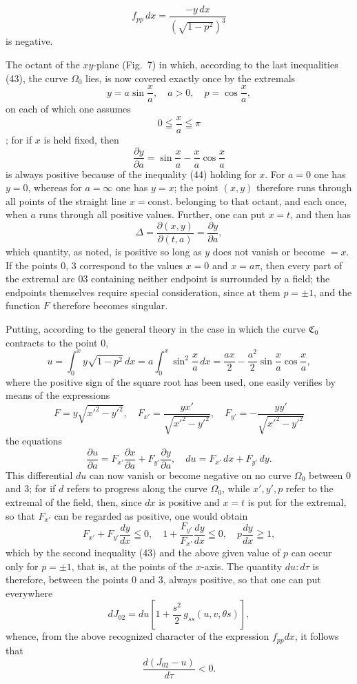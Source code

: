 \documentclass[11pt,a4paper,leqno]{article}
\begin{document}
\[
f_{pp}\,dx=\frac{-y\,dx}{\left(\sqrt{1-p^2}\right)^3}
\]
is negative.

The octant of the $xy$-plane (Fig.~7) in which, according to the last inequalities (43), the curve $\Omega_0$ lies, is now covered exactly once by the extremals
\[
y=a\sin\frac{x}{a},\quad a>0,\quad p=\cos\frac{x}{a},
\]
on each of which one assumes
\begin{equation}\tag{44}
0\leqq\frac{x}{a}\leqq\pi
\end{equation}
; for if $x$ is held fixed, then
\[
\frac{\partial y}{\partial a}
=\sin\frac{x}{a}-\frac{x}{a}\cos\frac{x}{a}
\]
is always positive because of the inequality (44) holding for $x$. For $a=0$ one has $y=0$, whereas for $a=\infty$ one has $y=x$; the point $(x,y)$ therefore runs through all points of the straight line $x=\text{const.}$ belonging to that octant, and each once, when $a$ runs through all positive values. Further, one can put $x=t$, and then has
\[
\Delta=\frac{\partial(x,y)}{\partial(t,a)}
=\frac{\partial y}{\partial a},
\]
which quantity, as noted, is positive so long as $y$ does not vanish or become $=x$. If the points 0, 3 correspond to the values $x=0$ and $x=a\pi$, then every part of the extremal arc 03 containing neither endpoint is surrounded by a field; the endpoints themselves require special consideration, since at them $p=\pm1$, and the function $F$ therefore becomes singular.

Putting, according to the general theory in the case in which the curve $\mathfrak{C}_0$ contracts to the point 0,
\[
u=\int_0^x y\sqrt{1-p^2}\,dx
=a\int_0^x\sin^2\frac{x}{a}\,dx
=\frac{ax}{2}-\frac{a^2}{2}\sin\frac{x}{a}\cos\frac{x}{a},
\]
where the positive sign of the square root has been used, one easily verifies by means of the expressions
\[
F=y\sqrt{x'^2-y'^2},\quad
F_{x'}=\frac{yx'}{\sqrt{x'^2-y'^2}},\quad
F_{y'}=-\frac{yy'}{\sqrt{x'^2-y'^2}}
\]
the equations
\[
\frac{\partial u}{\partial a}
=
F_{x'}\frac{\partial x}{\partial a}
+
F_{y'}\frac{\partial y}{\partial a},
\quad
du=F_{x'}\,dx+F_{y'}\,dy.
\]
This differential $du$ can now vanish or become negative on no curve $\Omega_0$ between 0 and 3; for if $d$ refers to progress along the curve $\Omega_0$, while $x',y',p$ refer to the extremal of the field, then, since $dx$ is positive and $x=t$ is put for the extremal, so that $F_{x'}$ can be regarded as positive, one would obtain
\[
F_{x'}+F_{y'}\frac{dy}{dx}\leqq0,\quad
1+\frac{F_{y'}}{F_{x'}}\frac{dy}{dx}\leqq0,\quad
p\frac{dy}{dx}\geqq1,
\]
which by the second inequality (43) and the above given value of $p$ can occur only for $p=\pm1$, that is, at the points of the $x$-axis. The quantity $du:d\tau$ is therefore, between
the points 0 and 3, always positive, so that one can put everywhere
\[
dJ_{02}=du\left[1+\frac{s^2}{2}\,g_{ss}(u,v,\theta s)\right],
\]
whence, from the above recognized character of the expression $f_{pp}dx$, it follows that
\[
\frac{d(J_{02}-u)}{d\tau}<0.
\]
\end{document}
